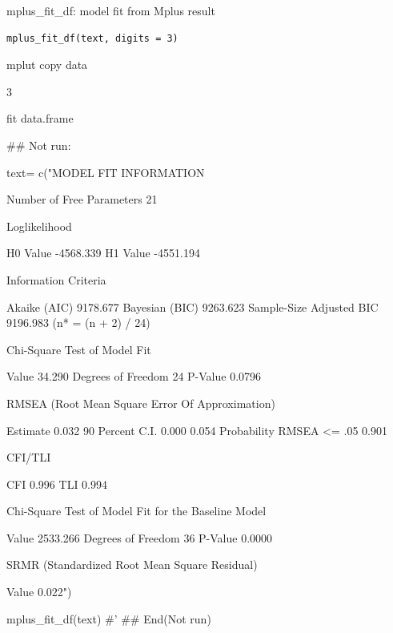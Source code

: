 \documentclass[a4paper]{book}
\begin{document}
%
\begin{Description}
mplus\_fit\_df: model fit from  Mplus result
\end{Description}
%
\begin{Usage}
\begin{verbatim}
mplus_fit_df(text, digits = 3)
\end{verbatim}
\end{Usage}
%
\begin{Arguments}
\begin{ldescription}
\item[\code{text}] mplut copy data

\item[\code{digits}] 3
\end{ldescription}
\end{Arguments}
%
\begin{Value}
fit data.frame
\end{Value}
%
\begin{Examples}
\begin{ExampleCode}


## Not run: 


text= c("MODEL FIT INFORMATION

Number of Free Parameters                       21

Loglikelihood

          H0 Value                       -4568.339
          H1 Value                       -4551.194

Information Criteria

          Akaike (AIC)                    9178.677
          Bayesian (BIC)                  9263.623
          Sample-Size Adjusted BIC        9196.983
            (n* = (n + 2) / 24)

Chi-Square Test of Model Fit

          Value                             34.290
          Degrees of Freedom                    24
          P-Value                           0.0796

RMSEA (Root Mean Square Error Of Approximation)

          Estimate                           0.032
          90 Percent C.I.                    0.000  0.054
          Probability RMSEA <= .05           0.901

CFI/TLI

          CFI                                0.996
          TLI                                0.994

Chi-Square Test of Model Fit for the Baseline Model

          Value                           2533.266
          Degrees of Freedom                    36
          P-Value                           0.0000

SRMR (Standardized Root Mean Square Residual)

          Value                              0.022")

mplus_fit_df(text)
#' 
## End(Not run)
\end{ExampleCode}
\end{Examples}
\end{document}
